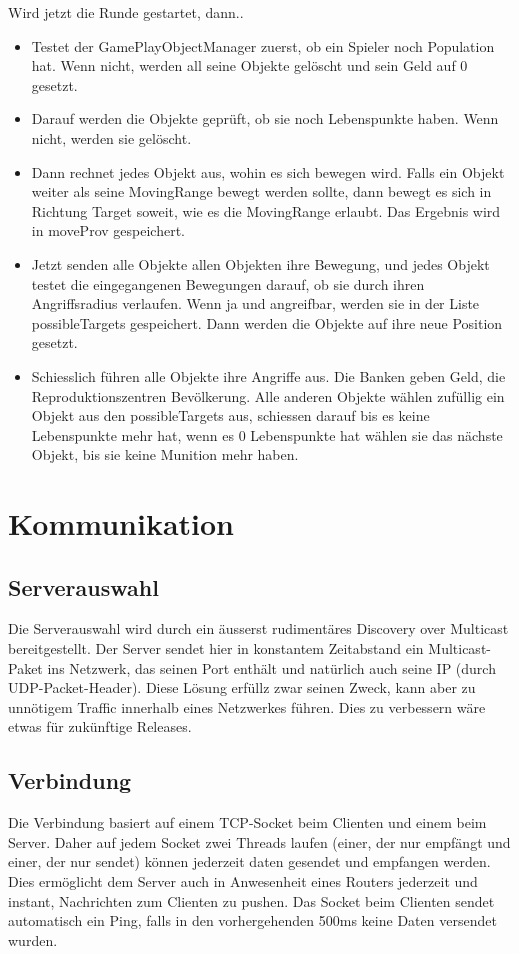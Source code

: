 \documentclass[ngerman, 12pt, pdftex]{scrartcl}[2006/07/30]
\begin{document}
Wird jetzt die Runde gestartet, dann..
\begin{itemize}

\item Testet der GamePlayObjectManager zuerst, ob ein Spieler noch Population hat. Wenn nicht, werden all seine Objekte gel\"{o}scht und sein Geld auf 0 gesetzt.
\item Darauf werden die Objekte gepr\"{u}ft, ob sie noch Lebenspunkte haben. Wenn nicht, werden sie gel\"{o}scht.
\item Dann rechnet jedes Objekt aus, wohin es sich bewegen wird. Falls ein Objekt weiter als seine MovingRange bewegt werden sollte, dann bewegt es sich in Richtung Target soweit, wie es die MovingRange erlaubt. Das Ergebnis wird in moveProv gespeichert.
\item Jetzt senden alle Objekte allen Objekten ihre Bewegung, und jedes Objekt testet die eingegangenen Bewegungen darauf, ob sie durch ihren Angriffsradius verlaufen. Wenn ja und angreifbar, werden sie in der Liste possibleTargets gespeichert. Dann werden die Objekte auf ihre neue Position gesetzt.
\item Schiesslich f\"{u}hren alle Objekte ihre Angriffe aus. Die Banken geben Geld, die Reproduktionszentren Bev\"{o}lkerung. Alle anderen Objekte w\"{a}hlen zuf\"{u}llig ein Objekt aus den possibleTargets aus, schiessen darauf bis es keine Lebenspunkte mehr hat, wenn es 0 Lebenspunkte hat w\"{a}hlen sie das n\"{a}chste Objekt, bis sie keine Munition mehr haben.
\end{itemize}



\section{Kommunikation}
\subsection{Serverauswahl}
Die Serverauswahl wird durch ein äusserst rudimentäres Discovery over Multicast bereitgestellt. Der Server sendet hier in konstantem Zeitabstand ein Multicast-Paket ins Netzwerk, das seinen Port enthält und natürlich auch seine IP (durch UDP-Packet-Header). Diese Lösung erfüllz zwar seinen Zweck, kann aber zu unnötigem Traffic innerhalb eines Netzwerkes führen. Dies zu verbessern wäre etwas für zukünftige Releases.

\subsection{Verbindung}
Die Verbindung basiert auf einem TCP-Socket beim Clienten und einem beim Server. Daher auf jedem Socket zwei Threads laufen (einer, der nur empfängt und einer, der nur sendet) können jederzeit daten gesendet und empfangen werden. Dies ermöglicht dem Server auch in Anwesenheit eines Routers jederzeit und instant, Nachrichten zum Clienten zu pushen. Das Socket beim Clienten sendet automatisch ein Ping, falls in den vorhergehenden 500ms keine Daten versendet wurden.
\end{document}
